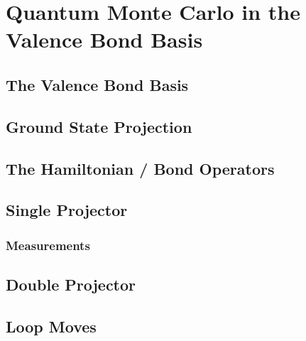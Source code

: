 \chapter{Quantum Monte Carlo in the Valence Bond Basis}
\section{The Valence Bond Basis}
\section{Ground State Projection}
\section{The Hamiltonian / Bond Operators}
\section{Single Projector}
\subsection{Measurements}
\section{Double Projector}
\section{Loop Moves}
